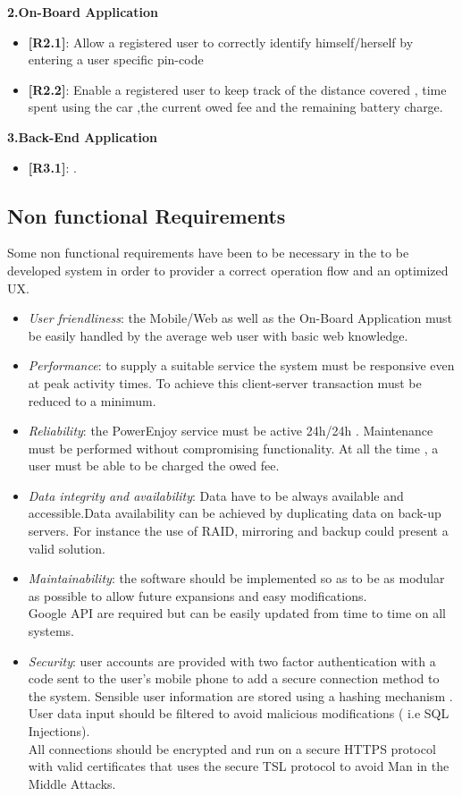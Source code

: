 \documentclass[12pt]{article}
\begin{document}
	\textbf{2.On-Board Application}
	\begin{itemize}
	 \item{\textbf{[R2.1]}}: Allow a registered user to correctly identify himself/herself by entering a user specific pin-code
 	 \item{\textbf{[R2.2]}}: Enable a registered user to keep track of the distance covered , time spent using the car ,the current owed fee and the remaining battery charge.
 	 \end{itemize}
 	 
 	 \textbf{3.Back-End Application}
	\begin{itemize}
	 \item{\textbf{[R3.1]}}: .
 	 \end{itemize}
	
	\subsection{Non functional Requirements} 
		Some non functional requirements have been to be necessary in the to be developed system in order to provider a correct operation flow and an optimized UX.
		\begin{itemize}
			\item \textit{User friendliness}: the Mobile/Web as well as the On-Board Application must be easily handled by the average web user with basic web knowledge.
			\item \textit{Performance}: to supply a suitable service the system must be responsive even at peak activity times. To achieve this client-server transaction must be reduced to a minimum.
		 	\item \textit{Reliability}: the PowerEnjoy service must be active 24h/24h . Maintenance must be performed without compromising functionality. At all the time , a user must be able to be charged the owed fee.	
		 	\item \textit{Data integrity and availability}: 
		 	Data have to be always available and accessible.Data availability can be achieved by duplicating data on back-up servers. For instance the use of RAID, mirroring and backup could present a valid solution.

		 	\item \textit{Maintainability}: the software should be implemented so as to be as modular as possible to allow future expansions and easy modifications.\\Google API are required but can be easily updated from time to time on all systems.
		 	\item \textit{Security}: user accounts are provided with two factor authentication with a code sent to the user's mobile phone to add a secure connection method to the system. Sensible user information are stored using a hashing mechanism .\\User data input should be filtered to avoid malicious modifications ( i.e SQL Injections). \\All connections should be encrypted and run on a secure HTTPS protocol with valid certificates that uses the secure TSL protocol to avoid Man in the Middle Attacks.
		\end{itemize}
		
\end{document}
